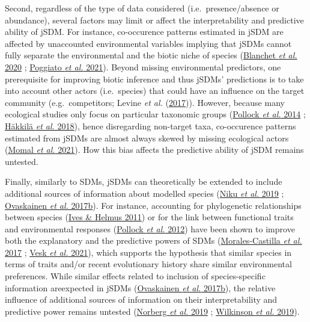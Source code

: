 \documentclass[9pt,biorxiv,doublespacing,lineno,endfloat]{lapreprint}
\begin{document}
Second, regardless of the type of data considered (i.e.~presence/absence
or abundance), several factors may limit or affect the interpretability
and predictive ability of jSDM. For instance, co-occurence patterns
estimated in jSDM are affected by unaccounted environmental variables
implying that jSDMs cannot fully separate the environmental and the
biotic niche of species (\protect\hyperlink{ref-Blanchet_2020}{Blanchet
\emph{et al.} 2020} ; \protect\hyperlink{ref-Poggiato_2021}{Poggiato
\emph{et al.} 2021}). Beyond missing environmental predictors, one
prerequisite for improving biotic inference and thus jSDMs' predictions
is to take into account other actors (i.e.~species) that could have an
influence on the target community (e.g.~competitors; Levine \emph{et
al.} (\protect\hyperlink{ref-Levine_2017}{2017})). However, because many
ecological studies only focus on particular taxonomic groups
(\protect\hyperlink{ref-Pollock_2014}{Pollock \emph{et al.} 2014} ;
\protect\hyperlink{ref-Hakkila_2018}{Häkkilä \emph{et al.} 2018}), hence
disregarding non-target taxa, co-occurence patterns estimated from jSDMs
are almost always skewed by missing ecological actors
(\protect\hyperlink{ref-Momal_2021}{Momal \emph{et al.} 2021}). How this
bias affects the predictive ability of jSDM remains untested.

Finally, similarly to SDMs, jSDMs can theoretically be extended to
include additional sources of information about modelled species
(\protect\hyperlink{ref-Niku_2019}{Niku \emph{et al.} 2019} ;
\protect\hyperlink{ref-Ovaskainen_2017a}{Ovaskainen \emph{et al.}
2017b}). For instance, accounting for phylogenetic relationships between
species (\protect\hyperlink{ref-Ives_2011}{Ives \& Helmus 2011}) or for
the link between functional traits and environmental responses
(\protect\hyperlink{ref-Pollock_2012}{Pollock \emph{et al.} 2012}) have
been shown to improve both the explanatory and the predictive powers of
SDMs (\protect\hyperlink{ref-Morales-Castilla_2017}{Morales-Castilla
\emph{et al.} 2017} ; \protect\hyperlink{ref-Vesk_2021}{Vesk \emph{et
al.} 2021}), which supports the hypothesis that similar species in terms
of traits and/or recent evolutionary history share similar environmental
preferences. While similar effects related to inclusion of
species-specific information areexpected in jSDMs
(\protect\hyperlink{ref-Ovaskainen_2017a}{Ovaskainen \emph{et al.}
2017b}), the relative influence of additional sources of information on
their interpretability and predictive power remains untested
(\protect\hyperlink{ref-Norberg_2019}{Norberg \emph{et al.} 2019} ;
\protect\hyperlink{ref-Wilkinson_2019}{Wilkinson \emph{et al.} 2019}).
\end{document}
